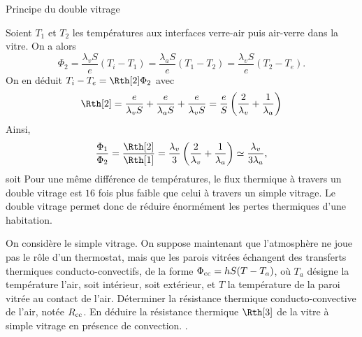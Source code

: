 \begin{exo}[PC][1][TD]{Principe du double vitrage}
\begin{quest}
{Soient $T_1$ et $T_2$ les températures aux interfaces verre-air puis air-verre dans la vitre. On a alors
$$\Phi_2 = \frac{\lambda_v S}{e} (T_i-T_1) = \frac{\lambda_a S}{e} (T_1-T_2) = \frac{\lambda_v S}{e} (T_2-T_e).$$
On en déduit $T_i-T_e = \Rth[2] \Phi_2$ avec
$$
\Rth[2] = \frac{e}{\lambda_v S} +  \frac{e}{\lambda_a S} + \frac{e}{\lambda_v S} = \frac{e}{S} \left(\frac{2}{\lambda_v}+\frac{1}{\lambda_a}\right)
$$
Ainsi,
$$
\frac{\Phi_1}{\Phi_2} = \frac{\Rth[2]}{\Rth[1]} = \frac{\lambda_v}{3} \left(\frac{2}{\lambda_v}+\frac{1}{\lambda_a}\right) \simeq \frac{\lambda_v}{3 \lambda_a},
$$
soit 
Pour une même différence de températures, le flux thermique à travers un double vitrage est $16$ fois plus faible que celui à travers un simple vitrage. Le double vitrage permet donc de réduire énormément les pertes thermiques d'une habitation.
}
\item  On considère le simple vitrage. On suppose maintenant que l'atmosphère ne joue pas le rôle d'un thermostat, mais que les parois vitrées échangent des transferts thermiques conducto-convectifs, de la forme $\Phi_{\rm cc} = hS(T-T_a)$,
où $T_a$ désigne la température l’air, soit intérieur, soit extérieur, et $T$ la température de la paroi vitrée au contact de l’air. Déterminer la résistance thermique conducto-convective de l'air, notée $R_{\rm cc}$. En déduire la résistance thermique $\Rth[3]$ de la vitre à simple vitrage en présence de convection. \AN.


\end{quest}
\end{exo}

